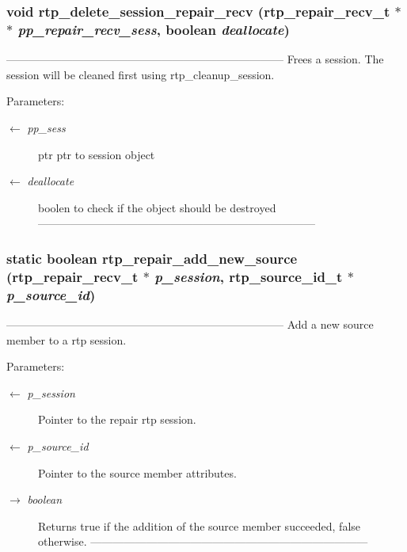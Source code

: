\subsubsection{\setlength{\rightskip}{0pt plus 5cm}void rtp\_\-delete\_\-session\_\-repair\_\-recv (\bf{rtp\_\-repair\_\-recv\_\-t} $\ast$$\ast$ {\em pp\_\-repair\_\-recv\_\-sess}, boolean {\em deallocate})}\label{rtp__repair__recv_8c_eedbc64c08d77028493de61af7af34a0}


--------------------------------------------------------------------------- Frees a session. The session will be cleaned first using rtp\_\-cleanup\_\-session.

\begin{Desc}
\item[Parameters:]
\begin{description}
\item[\mbox{$\leftarrow$} {\em pp\_\-sess}]ptr ptr to session object \item[\mbox{$\leftarrow$} {\em deallocate}]boolen to check if the object should be destroyed --------------------------------------------------------------------------- \end{description}
\end{Desc}
\subsubsection{\setlength{\rightskip}{0pt plus 5cm}static boolean rtp\_\-repair\_\-add\_\-new\_\-source (\bf{rtp\_\-repair\_\-recv\_\-t} $\ast$ {\em p\_\-session}, rtp\_\-source\_\-id\_\-t $\ast$ {\em p\_\-source\_\-id})\hspace{0.3cm}{\tt  [static]}}\label{rtp__repair__recv_8c_b5e40148ef7ffcc645e224a29979a2a6}


--------------------------------------------------------------------------- Add a new source member to a rtp session.

\begin{Desc}
\item[Parameters:]
\begin{description}
\item[\mbox{$\leftarrow$} {\em p\_\-session}]Pointer to the repair rtp session. \item[\mbox{$\leftarrow$} {\em p\_\-source\_\-id}]Pointer to the source member attributes. \item[\mbox{$\rightarrow$} {\em boolean}]Returns true if the addition of the source member succeeded, false otherwise. --------------------------------------------------------------------------- \end{description}
\end{Desc}
